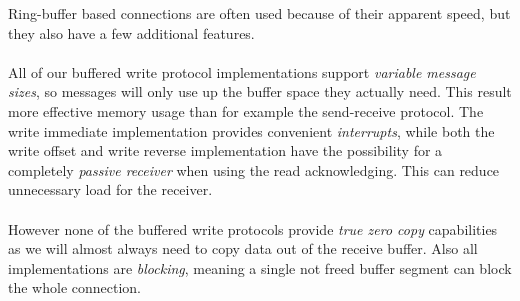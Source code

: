 Ring-buffer based connections are often used because of their apparent speed, but they also have a few additional features.


\paragraph{} All of our buffered write protocol implementations support \emph{variable message sizes}, so messages will only
use up the buffer space they actually need. This result more effective memory usage than for example the send-receive protocol.
The write immediate implementation provides convenient \emph{interrupts}, while both the write offset and write reverse 
implementation have the possibility for a completely \emph{passive receiver} when using the read acknowledging. This can
reduce unnecessary load for the receiver.

\paragraph{} However none of the buffered write protocols provide \emph{true zero copy} capabilities as we will almost always
need to copy data out of the receive buffer. Also all implementations are \emph{blocking}, meaning a single not freed buffer
segment can block the whole connection.













